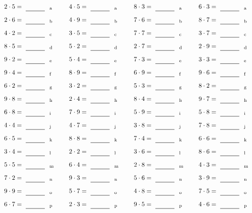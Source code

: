 \documentclass
[
  draft    = true,
  fontsize = 11pt,
  parskip  = half-
]
{scrartcl}
\begin{document}
\par\vfill\par
\begin{align*}
    \pline{2\cdot5}&=\rline{a}
  & \pline{4\cdot5}&=\rline{a}
  & \pline{8\cdot3}&=\rline{a}
  & \pline{6\cdot3}&=\rline{a} \\[1ex]
    \pline{2\cdot6}&=\rline{b}
  & \pline{4\cdot9}&=\rline{b}
  & \pline{7\cdot6}&=\rline{b}
  & \pline{8\cdot7}&=\rline{b} \\[1ex]
    \pline{4\cdot2}&=\rline{c}
  & \pline{3\cdot5}&=\rline{c}
  & \pline{7\cdot7}&=\rline{c}
  & \pline{3\cdot7}&=\rline{c} \\[1ex]
    \pline{8\cdot5}&=\rline{d}
  & \pline{5\cdot2}&=\rline{d}
  & \pline{2\cdot7}&=\rline{d}
  & \pline{2\cdot9}&=\rline{d} \\[1ex]
    \pline{9\cdot2}&=\rline{e}
  & \pline{5\cdot4}&=\rline{e}
  & \pline{7\cdot3}&=\rline{e}
  & \pline{3\cdot3}&=\rline{e} \\[1ex]
    \pline{9\cdot4}&=\rline{f}
  & \pline{8\cdot9}&=\rline{f}
  & \pline{6\cdot9}&=\rline{f}
  & \pline{9\cdot6}&=\rline{f} \\[1ex]
    \pline{6\cdot2}&=\rline{g}
  & \pline{3\cdot2}&=\rline{g}
  & \pline{5\cdot3}&=\rline{g}
  & \pline{8\cdot2}&=\rline{g} \\[1ex]
    \pline{9\cdot8}&=\rline{h}
  & \pline{2\cdot4}&=\rline{h}
  & \pline{8\cdot4}&=\rline{h}
  & \pline{9\cdot7}&=\rline{h} \\[1ex]
    \pline{6\cdot8}&=\rline{i}
  & \pline{7\cdot9}&=\rline{i}
  & \pline{5\cdot9}&=\rline{i}
  & \pline{5\cdot8}&=\rline{i} \\[1ex]
    \pline{4\cdot4}&=\rline{j}
  & \pline{4\cdot7}&=\rline{j}
  & \pline{3\cdot8}&=\rline{j}
  & \pline{7\cdot8}&=\rline{j} \\[1ex]
    \pline{6\cdot5}&=\rline{k}
  & \pline{8\cdot8}&=\rline{k}
  & \pline{7\cdot4}&=\rline{k}
  & \pline{6\cdot6}&=\rline{k} \\[1ex]
    \pline{3\cdot4}&=\rline{l}
  & \pline{2\cdot2}&=\rline{l}
  & \pline{3\cdot6}&=\rline{l}
  & \pline{8\cdot6}&=\rline{l} \\[1ex]
    \pline{5\cdot5}&=\rline{m}
  & \pline{6\cdot4}&=\rline{m}
  & \pline{2\cdot8}&=\rline{m}
  & \pline{4\cdot3}&=\rline{m} \\[1ex]
    \pline{7\cdot2}&=\rline{n}
  & \pline{9\cdot3}&=\rline{n}
  & \pline{5\cdot6}&=\rline{n}
  & \pline{3\cdot9}&=\rline{n} \\[1ex]
    \pline{9\cdot9}&=\rline{o}
  & \pline{5\cdot7}&=\rline{o}
  & \pline{4\cdot8}&=\rline{o}
  & \pline{7\cdot5}&=\rline{o} \\[1ex]
    \pline{6\cdot7}&=\rline{p}
  & \pline{2\cdot3}&=\rline{p}
  & \pline{9\cdot5}&=\rline{p}
  & \pline{4\cdot6}&=\rline{p}
\end{align*}
\end{document}
